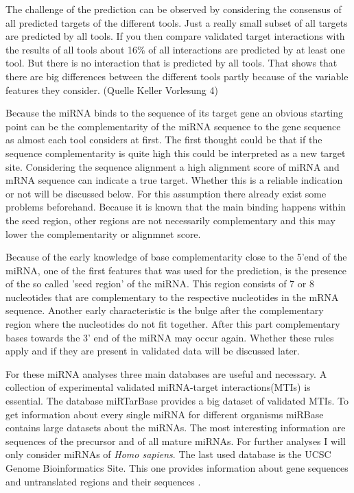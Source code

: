 \documentclass[12pt]{article}
\begin{document}
The challenge of the prediction can be observed by considering the consensus of all predicted targets of the different tools.  Just a really small subset of all targets are predicted by all tools. If you then compare validated target interactions with the results of all tools about 16\% of all interactions are predicted by at least one tool. But there is no interaction that is predicted by all tools. That shows that there are big differences between the different tools partly because of the variable features they consider. (Quelle Keller Vorlesung 4) 

Because the miRNA binds to the sequence of its target gene an obvious starting point can be the complementarity of the miRNA sequence to the gene sequence as almost each tool considers at first. The first thought could be that if the sequence complementarity is quite high this could be interpreted as a new target site. Considering the sequence alignment a high alignment score of miRNA and mRNA sequence can indicate a true target. Whether this is a reliable indication or not will be discussed below. For this assumption there already exist some problems beforehand. Because it is known that the main binding happens within the seed region, other regions are not necessarily complementary and this may lower the complementarity or alignmnet score. 

Because of the early knowledge of base complementarity close to the 5'end of the miRNA, one of the first features that was used for the prediction, is the presence of the so called 'seed region' of the miRNA. This region consists of 7 or 8 nucleotides that are complementary to the respective nucleotides in the mRNA sequence. Another early characteristic is the bulge after the complementary region where the nucleotides do not fit together. After this part complementary bases towards the 3' end of the miRNA may occur again. Whether these rules apply and if they are present in validated data will be discussed later. 

For these miRNA analyses three main databases are useful and necessary. A collection of experimental validated miRNA-target interactions(MTIs) is essential. The database miRTarBase provides a big dataset of validated MTIs. To get information about every single miRNA for different organisms miRBase contains large datasets about the miRNAs. The most interesting information are sequences of the precursor and of all mature miRNAs. For further analyses I will only consider miRNAs of \textit{Homo sapiens}. The last used database is the UCSC Genome Bioinformatics Site. This one provides information about gene sequences and untranslated regions and their sequences \cite{biodb}.
 
\end{document}

